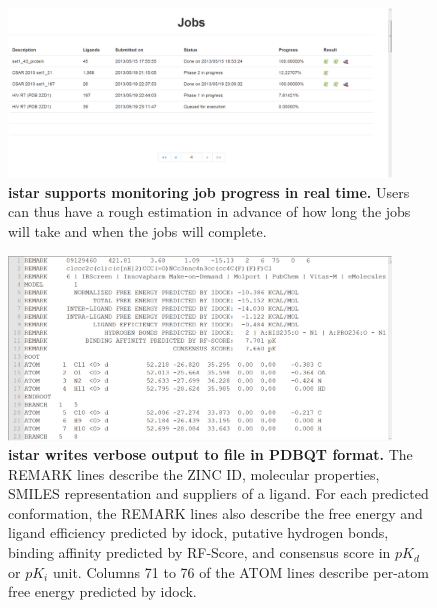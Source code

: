 \documentclass[10pt]{article}
\begin{document}
\begin{figure}[!ht]
\begin{center}
\includegraphics[width=4in]{Progress.eps}
\end{center}
\caption{
{\bf istar supports monitoring job progress in real time.} Users can thus have a rough estimation in advance of how long the jobs will take and when the jobs will complete.
}
\label{Progress}
\end{figure}

\begin{figure}[!ht]
\begin{center}
\includegraphics[width=4in]{OutputPDBQT.eps}
\end{center}
\caption{
{\bf istar writes verbose output to file in PDBQT format.} The REMARK lines describe the ZINC ID, molecular properties, SMILES representation and suppliers of a ligand. For each predicted conformation, the REMARK lines also describe the free energy and ligand efficiency predicted by idock, putative hydrogen bonds, binding affinity predicted by RF-Score, and consensus score in $pK_d$ or $pK_i$ unit. Columns 71 to 76 of the ATOM lines describe per-atom free energy predicted by idock.
}
\label{OutputPDBQT}
\end{figure}
\end{document}
